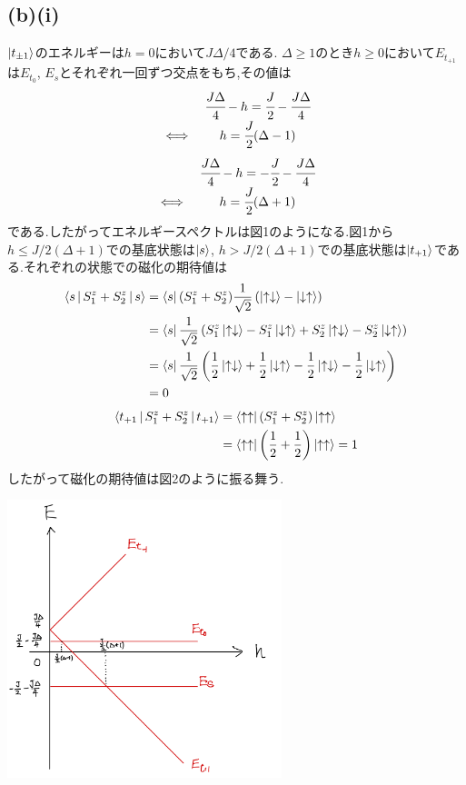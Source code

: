 \documentclass[uplatex,a4j,11pt,dvipdfmx]{jsarticle}
\makeatletter
\def\fgcaption{\def\@captype{figure}\caption}
\def\fgcaption{\def\@captype{figure}\caption}
\newcommand{\up}{\uparrow}
\newcommand{\dn}{\downarrow}
\makeatother
\begin{document}
\subsection*{(b)(i)}
$\Ket{t_{\pm1}}$のエネルギーは$h=0$において$J\Delta/4$である.
$\Delta\geq1$のとき$h\geq0$において$E_{t_{+1}}$は$E_{t_0}$, $E_s$とそれぞれ一回ずつ交点をもち,その値は
\begin{align}
  \begin{array}{cc}
    &\cfrac{J\Delta}{4}-h=\cfrac{J}{2}-\cfrac{J\Delta}{4}\\
    \iff&h=\cfrac{J}{2}(\Delta-1)
  \end{array}
\end{align}
\begin{align}
  \begin{array}{cc}
    &\cfrac{J\Delta}{4}-h=-\cfrac{J}{2}-\cfrac{J\Delta}{4}\\
    \iff&h=\cfrac{J}{2}(\Delta+1)
  \end{array}
\end{align}
である.したがってエネルギースペクトルは図1のようになる.図1から$h\leq J/2(\Delta+1)$での基底状態は$\Ket{s}$,
$h>J/2(\Delta+1)$での基底状態は$\Ket{t_{+1}}$である.それぞれの状態での磁化の期待値は
\begin{align}
  \begin{split}
    \Braket{s|S_1^z+S_2^z|s}&=\Bra{s}(S_1^z+S_2^z)\frac{1}{\sqrt{2}}\left(\Ket{\up\dn}-\Ket{\dn\up}\right)\\
    &=\Bra{s}\frac{1}{\sqrt{2}}\left(S_1^z\Ket{\up\dn}-S_1^z\Ket{\dn\up}+S_2^z\Ket{\up\dn}-S_2^z\Ket{\dn\up}\right)\\
    &=\Bra{s}\frac{1}{\sqrt{2}}\left(\frac{1}{2}\Ket{\up\dn}+\frac{1}{2}\Ket{\dn\up}-\frac{1}{2}\Ket{\up\dn}-\frac{1}{2}\Ket{\dn\up}\right)\\
    &=0
  \end{split}
\end{align}
\begin{align}
  \begin{split}
    \Braket{t_{+1}|S_1^z+S_2^z|t_{+1}}&=\Bra{\up\up}(S_1^z+S_2^z)\Ket{\up\up}\\
    &=\Bra{\up\up}\left(\frac{1}{2}+\frac{1}{2}\right)\Ket{\up\up}=1
  \end{split}
\end{align}
したがって磁化の期待値は図2のように振る舞う.
\begin{center}
  \includegraphics[width=8cm]{espec_dgeq0.png}
  \fgcaption{$\Delta\geq1$の場合のエネルギースペクトル}
\end{center}
\end{document}

